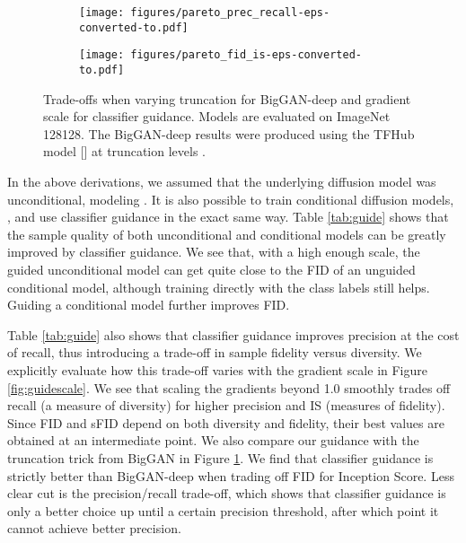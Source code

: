 \documentclass{article}
\newcommand{\shortcite}[1]{[\citenum{#1}]}
\begin{document}
\begin{figure}[t!]
    \begin{center}
    \begin{subfigure}[]{0.48\textwidth}
    \centerline{\texttt{[image: figures/pareto\_prec\_recall-eps-converted-to.pdf]}}
    \end{subfigure}\quad
    \begin{subfigure}[]{0.48\textwidth}
    \centerline{\texttt{[image: figures/pareto\_fid\_is-eps-converted-to.pdf]}}
    \end{subfigure}
    \caption{\label{fig:gan_comparison_pareto} Trade-offs when varying truncation for BigGAN-deep and gradient scale for classifier guidance. Models are evaluated on ImageNet 128128. The BigGAN-deep results were produced using the TFHub model \shortcite{tfhubbiggan} at truncation levels .}
    \end{center}
    \vskip -0.2in
\end{figure}

In the above derivations, we assumed that the underlying diffusion model was unconditional, modeling . It is also possible to train conditional diffusion models, , and use classifier guidance in the exact same way. 
Table \ref{tab:guide} shows that the sample quality of both unconditional and conditional models can be greatly improved by classifier guidance. We see that, with a high enough scale, the guided unconditional model can get quite close to the FID of an unguided conditional model, although training directly with the class labels still helps. Guiding a conditional model further improves FID. 

Table \ref{tab:guide} also shows that classifier guidance improves precision at the cost of recall, thus introducing a trade-off in sample fidelity versus diversity. We explicitly evaluate how this trade-off varies with the gradient scale in Figure \ref{fig:guidescale}. We see that scaling the gradients beyond 1.0 smoothly trades off recall (a measure of diversity) for higher precision and IS (measures of fidelity). Since FID and sFID depend on both diversity and fidelity, their best values are obtained at an intermediate point. We also compare our guidance with the truncation trick from BigGAN in Figure \ref{fig:gan_comparison_pareto}. We find that classifier guidance is strictly better than BigGAN-deep when trading off FID for Inception Score. Less clear cut is the precision/recall trade-off, which shows that classifier guidance is only a better choice up until a certain precision threshold, after which point it cannot achieve better precision.
\end{document}
